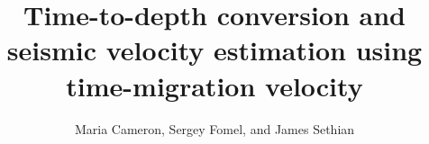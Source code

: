 \title{Time-to-depth conversion and seismic velocity estimation using time-migration velocity}

\renewcommand{\thefootnote}{\fnsymbol{footnote}} 


\address{
\footnotemark[1]Department of Mathematics, \\
Courant Institute of Mathematical Science, \\
New York University,\\
251 Mercer Street, New York, NY 10012 \\
\footnotemark[2]Bureau of Economic Geology, \\
John A. and Katherine G. Jackson School of Geosciences \\
The University of Texas at Austin \\
University Station, Box X \\
Austin, TX 78713-8972 \\
\footnotemark[3]Department of Mathematics, \\
University of California, Berkeley, \\
Berkeley, CA, 94720}
\author{Maria Cameron\footnotemark[1], Sergey Fomel\footnotemark[2], and James Sethian\footnotemark[3]}


\maketitle

\newpage

